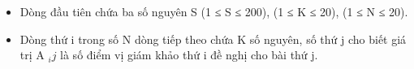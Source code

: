 \begin{itemize}
	\item Dòng đầu tiên chứa ba số nguyên S (1 ≤ S ≤ 200), (1 ≤ K ≤ 20), (1 ≤ N ≤ 20).
	\item Dòng thứ i trong số N dòng tiếp theo chứa K số nguyên, số thứ j cho biết giá trị A $_ ij $ là số điểm vị giám khảo thứ i đề nghị cho bài thứ j.
\end{itemize}

\